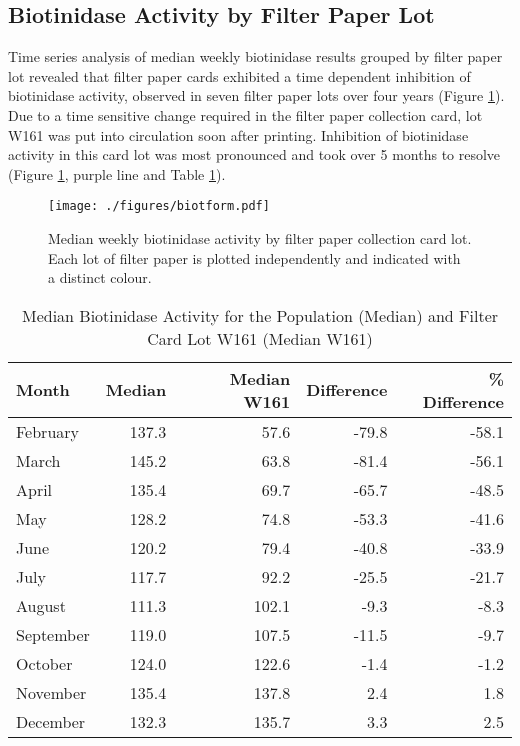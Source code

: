 \documentclass[review]{elsarticle}
\begin{document}
\clearpage

\subsection*{Biotinidase Activity by Filter Paper Lot}
\label{sec:org39644fd}
Time series analysis of median weekly biotinidase results grouped by
filter paper lot revealed that filter paper cards exhibited a time
dependent inhibition of biotinidase activity, observed in seven filter
paper lots over four years (Figure \ref{fig:orga06746b}). Due to a time sensitive
change required in the filter paper collection card, lot W161 was put into
circulation soon after printing. Inhibition of biotinidase activity in
this card lot was most pronounced and took over 5 months to resolve
(Figure \ref{fig:orga06746b}, purple line and Table \ref{tab:w161_months}).

\begin{figure}[htbp]
\centering
\texttt{[image: ./figures/biotform.pdf]}
\caption{\label{fig:orga06746b}Median weekly biotinidase activity by filter paper collection card lot. Each lot of filter paper is plotted independently and indicated with a distinct colour.}
\end{figure}

\clearpage

\begin{table}[ht]
\centering
\begin{tabular}{lrrrr}
  \hline
Month & Median & Median W161 & Difference & \% Difference \\ 
  \hline
February & 137.3 & 57.6 & -79.8 & -58.1 \\ 
  March & 145.2 & 63.8 & -81.4 & -56.1 \\ 
  April & 135.4 & 69.7 & -65.7 & -48.5 \\ 
  May & 128.2 & 74.8 & -53.3 & -41.6 \\ 
  June & 120.2 & 79.4 & -40.8 & -33.9 \\ 
  July & 117.7 & 92.2 & -25.5 & -21.7 \\ 
  August & 111.3 & 102.1 & -9.3 & -8.3 \\ 
  September & 119.0 & 107.5 & -11.5 & -9.7 \\ 
  October & 124.0 & 122.6 & -1.4 & -1.2 \\ 
  November & 135.4 & 137.8 & 2.4 & 1.8 \\ 
  December & 132.3 & 135.7 & 3.3 & 2.5 \\ 
   \hline
\end{tabular}
\caption{Median Biotinidase Activity for the Population (Median) and Filter Card Lot W161 (Median W161)} 
\label{tab:w161_months}
\end{table}
\end{document}
